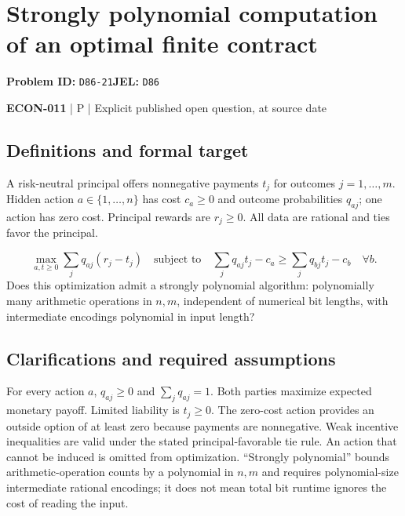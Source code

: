 \documentclass[11pt,a4paper]{article}
\begin{document}
\section*{Strongly polynomial computation of an optimal finite contract}
\textbf{Problem ID:} \texttt{D86-21}\quad \textbf{JEL:} \texttt{D86}\par
\label{problem:OP-0596}


\label{audited:ECON-011}

{\sffamily\small\color{muted}\textbf{ECON-011} | P | Explicit published open question, at source date\par}

\subsection*{Definitions and formal target}

A risk-neutral principal offers nonnegative payments $t_j$ for outcomes $j=1,\ldots,m$. Hidden action $a\in\{1,\ldots,n\}$ has cost $c_a\geq0$ and outcome probabilities $q_{aj}$; one action has zero cost. Principal rewards are $r_j\geq0$. All data are rational and ties favor the principal.

\[
 \max_{a,t\geq0}\sum_jq_{aj}(r_j-t_j)
 \quad\text{subject to}\quad
 \sum_jq_{aj}t_j-c_a\geq\sum_jq_{bj}t_j-c_b\quad\forall b.
\]
Does this optimization admit a strongly polynomial algorithm: polynomially many arithmetic operations in $n,m$, independent of numerical bit lengths, with intermediate encodings polynomial in input length?

\subsection*{Clarifications and required assumptions}

For every action $a$, $q_{aj}\geq0$ and $\sum_jq_{aj}=1$. Both parties maximize expected monetary payoff. Limited liability is $t_j\geq0$. The zero-cost action provides an outside option of at least zero because payments are nonnegative. Weak incentive inequalities are valid under the stated principal-favorable tie rule. An action that cannot be induced is omitted from optimization. ``Strongly polynomial'' bounds arithmetic-operation counts by a polynomial in $n,m$ and requires polynomial-size intermediate rational encodings; it does not mean total bit runtime ignores the cost of reading the input.
\end{document}
